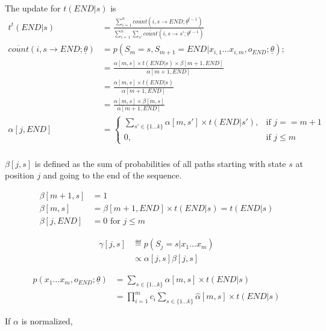 The update for $t(END|s)$ is
\begin{align}
t^t(END|s) &= \frac{\sum_{i = 1}^n \overline{count}(i, s\rightarrow END;\underline{\theta}^{t-1})}
    {\sum_{i = 1}^n\sum_{s'} \overline{count}(i, s\rightarrow s';\underline{\theta}^{t-1})} \\
\overline{count}(i, s\rightarrow END;\underline{\theta}) &= p(S_m = s, S_{m + 1} = END | x_{i, 1}\ldots x_{i, m}, o_{END}; \underline{\theta});\\
    &= \frac{\alpha[m, s]\times t(END|s)\times \beta[m + 1, END]}{\alpha[m + 1, END]}\\
    &= \frac{\alpha[m, s]\times t(END|s)}{\alpha[m + 1, END]}\\
    &= \frac{\alpha[m, s]\times \beta[m, s]}{\alpha[m + 1, END]}\\
\alpha[j, END] &= 
\begin{cases}
\sum_{s'\in\{1\ldots k\}}\alpha[m, s']\times t(END|s'), & \text{if } j == m + 1 \\
0, & \text{if } j\leq m
\end{cases} \\
\end{align}

$\beta[j, s]$ is defined as the sum of probabilities of all paths starting with 
state $s$ at position $j$ and going to the end of the sequence.

\begin{align}
\beta[m + 1, s] &= 1 \\
\beta[m, s] &= \beta[m + 1, END]\times t(END | s) = t(END | s) \\
\beta[j, END] &= 0 \text{ for } j \leq m
\end{align}

\begin{align}
\gamma[j, s]&\eqdef p(S_j = s | x_1\ldots x_m) \\
  &\propto \alpha[j, s]\beta[j, s]
\end{align}

\begin{align}
p(x_1\ldots x_m, o_{END}; \underline{\theta}) &= \sum_{s\in \{1\ldots k\}}\alpha[m, s]\times t(END|s) \\
    &= \prod_{i = 1}^m c_i \sum_{s\in \{1\ldots k\}}\hat{\alpha}[m, s]\times t(END|s)
\end{align}

If $\alpha$ is normalized, 

